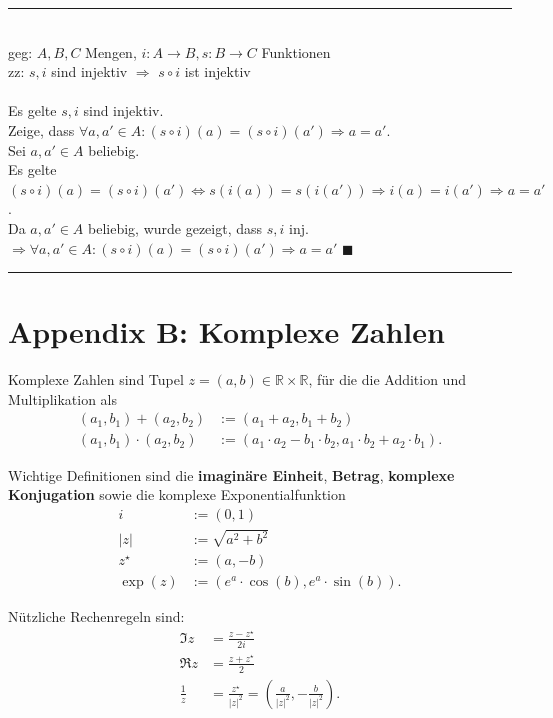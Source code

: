\documentclass{article}
\newcommand{\lr}[1]{\left(#1\right)}
\begin{document}
\vspace{0.5cm}

{\color{blue}
\hrule
	\\
	geg: $A,B,C$ Mengen, $i:A\rightarrow B, s:B\rightarrow C$ Funktionen\\
	 zz: $s,i$ sind injektiv $\Rightarrow$ $s\circ i$ ist injektiv\\
	\\
	Es gelte $s,i$ sind injektiv.\\
	Zeige, dass $\forall a,a'\in A: (s\circ i)(a) = (s\circ i)(a') \Rightarrow a=a'$.\\
	Sei $a,a'\in A$ beliebig.\\
	Es gelte $(s\circ i)(a) = (s\circ i)(a') \Leftrightarrow s(i(a)) = s(i(a')) \Rightarrow i(a) = i(a') \Rightarrow a=a'$.\\
	Da $a,a'\in A$ beliebig, wurde gezeigt, dass $s,i$ inj. $\Rightarrow \forall a,a'\in A: (s\circ i)(a) = (s\circ i)(a') \Rightarrow a=a'$ \hfill $\blacksquare$
\hrule
}


\newpage


\section{Appendix B: Komplexe Zahlen}
Komplexe Zahlen sind Tupel $z = (a,b) \in \mathbb{R} \times \mathbb{R}$, für die die Addition und Multiplikation als
	\begin{align}
		(a_1, b_1) + (a_2, b_2) &:= (a_1 + a_2, b_1 + b_2) \\
		(a_1, b_1) \cdot (a_2, b_2) &:= (a_1 \cdot a_2 - b_1 \cdot b_2, a_1 \cdot b_2 + a_2 \cdot b_1).
	\end{align}

Wichtige Definitionen sind die \textbf{imaginäre Einheit}, \textbf{Betrag}, \textbf{komplexe Konjugation} sowie die komplexe Exponentialfunktion
	\begin{align}
		i &:= (0,1) \\
		|z| &:= \sqrt{a^2 + b^2} \\
		z^\star &:= (a,-b) \\
		\exp(z) &:= (e^a \cdot \cos(b), e^a \cdot \sin(b)).
	\end{align}

Nützliche Rechenregeln sind:
	\begin{align}
		\Im z &= \frac{z - z^\star}{2i} \\
		\Re z &= \frac{z + z^\star}{2} \\
		\frac{1}{z} &= \frac{z^\star}{|z|^2} = \lr{\frac{a}{|z|^2}, -\frac{b}{|z|^2}  }.
	\end{align}
\end{document}
